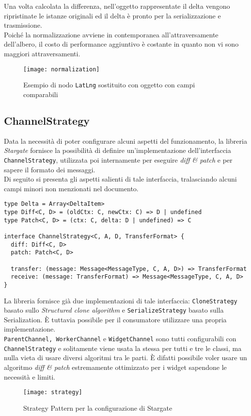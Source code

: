Una volta calcolata la differenza, nell'oggetto rappresentate il delta vengono ripristinate le istanze originali ed il delta è pronto per la serializzazione e trasmissione. \\

Poiché la normalizzazione avviene in contemporanea all'attraversamente dell'albero, il costo di performance aggiuntivo è costante in quanto non vi sono maggiori attraversamenti.

\begin{figure}[H] 
  \centering 
  \texttt{[image: normalization]} 
  \caption{Esempio di nodo \texttt{LatLng} sostituito con oggetto con campi comparabili}
\end{figure}

\subsection{ChannelStrategy}

Data la necessità di poter configurare alcuni aspetti del funzionamento, la libreria \textit{Stargate} fornisce la possibilità di definire un'implementazione dell'interfaccia \texttt{ChannelStrategy}, utilizzata poi internamente per eseguire \textit{diff \& patch} e per sapere il formato dei messaggi. \\

Di seguito si presenta gli aspetti salienti di tale interfaccia, tralasciando alcuni campi minori non menzionati nel documento. \\

\begin{lstlisting}[language={[Sharp]C}]
type Delta = Array<DeltaItem>
type Diff<C, D> = (oldCtx: C, newCtx: C) => D | undefined
type Patch<C, D> = (ctx: C, delta: D | undefined) => C

interface ChannelStrategy<C, A, D, TransferFormat> {
  diff: Diff<C, D>
  patch: Patch<C, D>

  transfer: (message: Message<MessageType, C, A, D>) => TransferFormat
  receive: (message: TransferFormat) => Message<MessageType, C, A, D>
}
\end{lstlisting}

La libreria fornisce già due implementazioni di tale interfaccia: \texttt{CloneStrategy} basato sullo \textit{Structured clone algorithm} e \texttt{SerializeStrategy} basato sulla Serialization. È tuttavia possibile per il consumatore utilizzare una propria implementazione. \\

\texttt{ParentChannel, WorkerChannel} e \texttt{WidgetChannel} sono tutti configurabili con \texttt{ChannelStrategy} e solitamente viene usata la stessa per tutti e tre le classi, ma nulla vieta di usare diversi algoritmi tra le parti. È difatti possibile voler usare un algoritmo \textit{diff \& patch} estremamente ottimizzato per i widget sapendone le necessità e limiti.

\begin{figure}[H] 
  \centering 
  \texttt{[image: strategy]} 
  \caption{Strategy Pattern per la configurazione di Stargate}
\end{figure}
